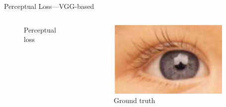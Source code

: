 \documentclass{beamer}
\begin{document}
\begin{frame}{Perceptual Loss---VGG-based}
\begin{columns}
\begin{column}{0.33\linewidth}
\begin{figure}[h]
      \caption*{Perceptual loss}
    \end{figure}
  \end{column}  \begin{column}{0.33\linewidth}
    \begin{figure}[h]
      \centering
        \includegraphics[width=0.9\textwidth]{perceptual_loss_gt}
      \caption*{Ground truth}
    \end{figure}
  \end{column}
\end{columns}
\end{frame}
\end{document}
